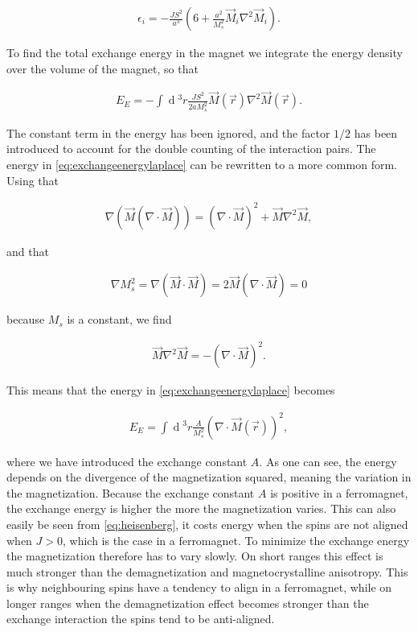 \documentclass[1p]{elsarticle}		%
\renewcommand{\d}[1]{\ensuremath{\operatorname{d}\!{#1}}}
\begin{document}
\begin{align}
\epsilon_i = -\frac{JS^2}{a^3}(6+\frac{a^2}{M_s^2}\vec{M}_i\nabla^2\vec{M}_i).
\end{align}

To find the total exchange energy in the magnet we integrate the energy density over the volume of the magnet, so that

\begin{align}
\label{eq:exchangeenergylaplace}
E_E = -\int \d {^3}r \frac{JS^2}{2aM_s^2} \vec{M}(\vec{r})\nabla^2\vec{M}(\vec{r}).
\end{align}

The constant term in the energy has been ignored, and the factor $1/2$ has been introduced to account for the double counting of the interaction pairs. The energy in \eqref{eq:exchangeenergylaplace} can be rewritten to a more common form. Using that 

\begin{align}
\nabla(\vec{M} (\nabla\cdot\vec{M})) = (\nabla\cdot\vec{M})^2 + \vec{M}\nabla^2\vec{M},
\end{align}

and that

\begin{align}
\nabla M_s^2 = \nabla (\vec{M}\cdot\vec{M}) = 2\vec{M}(\nabla\cdot\vec{M}) = 0
\end{align} 

because $M_s$ is a constant, we find

\begin{align}
\vec{M}\nabla^2\vec{M} = - (\nabla\cdot\vec{M})^2.
\end{align}

This means that the energy in \eqref{eq:exchangeenergylaplace} becomes

\begin{align}
\label{eq:exchangeenergydiv}
E_E = \int \d {^3}r \frac{A}{M_s^2} (\nabla\cdot\vec{M}(\vec{r}))^2,
\end{align}

where we have introduced the exchange constant $A$. As one can see, the energy depends on the divergence of the magnetization squared, meaning the variation in the magnetization. Because the exchange constant $A$ is positive in a ferromagnet, the exchange energy is higher the more the magnetization varies. This can also easily be seen from \eqref{eq:heisenberg}, it costs energy when the spins are not aligned when $J>0$, which is the case in a ferromagnet. To minimize the exchange energy the magnetization therefore has to vary slowly. On short ranges this effect is much stronger than the demagnetization and magnetocrystalline anisotropy. This is why neighbouring spins have a tendency to align in a ferromagnet, while on longer ranges when the demagnetization effect becomes stronger than the exchange interaction the spins tend to be anti-aligned.
\end{document}
